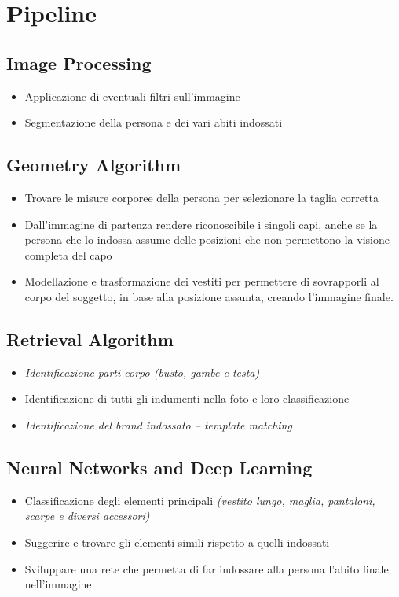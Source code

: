 \documentclass[10pt]{article}
\begin{document}
\section{Pipeline}
 
\subsection{Image Processing}
\begin{itemize}
\item Applicazione di eventuali filtri sull'immagine
\item Segmentazione della persona e dei vari abiti indossati 
\end{itemize}

\subsection{Geometry Algorithm}
\begin{itemize}
\item Trovare le misure corporee della persona per selezionare la taglia corretta
\item Dall'immagine di partenza rendere riconoscibile i singoli capi, anche se la persona che lo indossa assume delle posizioni che non permettono la visione completa del capo
\item Modellazione e trasformazione dei vestiti per permettere di sovrapporli al corpo del soggetto, in base alla posizione assunta, creando l'immagine finale.
\end{itemize}

\subsection{Retrieval Algorithm}
\begin{itemize}
\item \textit{Identificazione parti corpo (busto, gambe e testa)}
\item Identificazione di tutti gli indumenti nella foto e loro classificazione
\item \textit{Identificazione del brand indossato -- template matching}
\end{itemize}

\subsection{Neural Networks and Deep Learning}
\begin{itemize}
\item Classificazione degli elementi principali \textit{(vestito lungo, maglia, pantaloni, scarpe e diversi accessori)}
\item Suggerire e trovare gli elementi simili rispetto a quelli indossati
\item Sviluppare una rete che permetta di far indossare alla persona l'abito finale nell'immagine
\end{itemize}
\end{document}
